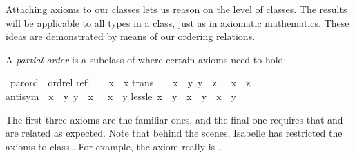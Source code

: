 %
\begin{isabellebody}%
\def\isabellecontext{Axioms}%
%
\isadelimtheory
%
\endisadelimtheory
%
\isatagtheory
\isamarkupfalse%
%
\endisatagtheory
{\isafoldtheory}%
%
\isadelimtheory
%
\endisadelimtheory
%
\isamarkuptrue%
%
\begin{isamarkuptext}%
Attaching axioms to our classes lets us reason on the
level of classes.  The results will be applicable to all types in a class,
just as in axiomatic mathematics.  These ideas are demonstrated by means of
our ordering relations.%
\end{isamarkuptext}%
\isamarkuptrue%
%
\isamarkuptrue%
%
\begin{isamarkuptext}%
A \emph{partial order} is a subclass of 
where certain axioms need to hold:%
\end{isamarkuptext}%
\isamarkuptrue%
\isamarkupfalse%
\ parord\ {\isacharless}\ ordrel\isanewline
refl{\isacharcolon}\ \ \ \ {\isachardoublequoteopen}x\ {\isacharless}{\isacharless}{\isacharequal}\ x{\isachardoublequoteclose}\isanewline
trans{\isacharcolon}\ \ \ {\isachardoublequoteopen}{\isasymlbrakk}\ x\ {\isacharless}{\isacharless}{\isacharequal}\ y{\isacharsemicolon}\ y\ {\isacharless}{\isacharless}{\isacharequal}\ z\ {\isasymrbrakk}\ {\isasymLongrightarrow}\ x\ {\isacharless}{\isacharless}{\isacharequal}\ z{\isachardoublequoteclose}\isanewline
antisym{\isacharcolon}\ {\isachardoublequoteopen}{\isasymlbrakk}\ x\ {\isacharless}{\isacharless}{\isacharequal}\ y{\isacharsemicolon}\ y\ {\isacharless}{\isacharless}{\isacharequal}\ x\ {\isasymrbrakk}\ {\isasymLongrightarrow}\ x\ {\isacharequal}\ y{\isachardoublequoteclose}\isanewline
less{\isacharunderscore}le{\isacharcolon}\ {\isachardoublequoteopen}x\ {\isacharless}{\isacharless}\ y\ {\isacharequal}\ {\isacharparenleft}x\ {\isacharless}{\isacharless}{\isacharequal}\ y\ {\isasymand}\ x\ {\isasymnoteq}\ y{\isacharparenright}{\isachardoublequoteclose}%
\begin{isamarkuptext}%
\noindent
The first three axioms are the familiar ones, and the final one
requires that \isa{{\isacharless}{\isacharless}} and \isa{{\isacharless}{\isacharless}{\isacharequal}} are related as expected.
Note that behind the scenes, Isabelle has restricted the axioms to class
. For example, the axiom  really is
.


\end{isamarkuptext}
\end{isabellebody}
